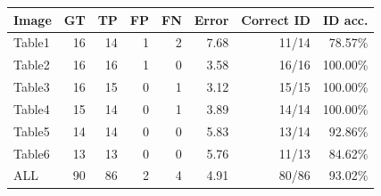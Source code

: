 \begin{tabular}{lrrrrrrr}
\toprule
Image & GT & TP & FP & FN & Error & Correct ID & ID acc.\\
\midrule
Table1 & 16 & 14 & 1 & 2 & 7.68 & 11/14 & 78.57\% \\
Table2 & 16 & 16 & 1 & 0 & 3.58 & 16/16 & 100.00\% \\
Table3 & 16 & 15 & 0 & 1 & 3.12 & 15/15 & 100.00\% \\
Table4 & 15 & 14 & 0 & 1 & 3.89 & 14/14 & 100.00\% \\
Table5 & 14 & 14 & 0 & 0 & 5.83 & 13/14 & 92.86\% \\
Table6 & 13 & 13 & 0 & 0 & 5.76 & 11/13 & 84.62\% \\
ALL & 90 & 86 & 2 & 4 & 4.91 & 80/86 & 93.02\% \\
\bottomrule
\end{tabular}

